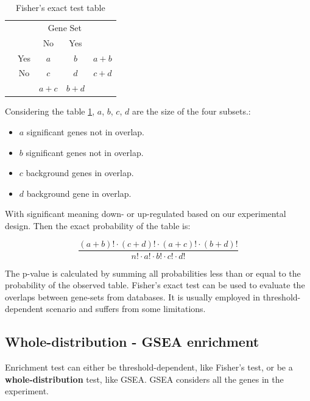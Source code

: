 		\begin{table}[H]
			\centering
			\begin{tabular}{ccccc}
				\multirow{4}{*}{\rotatebox[origin=c]{90}{\tiny{Up regulated genes}}}& \multicolumn{4}{c}{Gene Set}\\
				 & & No & Yes & \\
				 \cline{3-4}
				 &Yes & \multicolumn{1}{|c|}{$a$} & \multicolumn{1}{|c|}{$b$} & $a+b$\\
				 \cline{3-4}
				 &No & \multicolumn{1}{|c|}{$c$} & \multicolumn{1}{|c|}{$d$} & $c+d$\\
				 \cline{3-4}
				 & & $a+c$ & $b+d$ & \\
			\end{tabular}
			\caption{Fisher's exact test table}
			\label{tab:fisher}
		\end{table}

		Considering the table \ref{tab:fisher}, $a$, $b$, $c$, $d$ are the size of the four subsets.:

		\begin{multicols}{2}
			\begin{itemize}
				\item $a$ significant genes not in overlap.
				\item $b$ significant genes not in overlap.
				\item $c$ background genes in overlap.
				\item $d$ background gene in overlap.
			\end{itemize}
		\end{multicols}

		With significant meaning down- or up-regulated based on our experimental design.
		Then the exact probability of the table is:

		$$\frac{(a+b)!\cdot(c+d)!\cdot(a+c)!\cdot(b+d)!}{n!\cdot a!\cdot b!\cdot c!\cdot d!}$$

		The p-value is calculated by summing all probabilities less than or equal to the probability of the observed table.
		Fisher's exact test can be used to evaluate the overlaps between gene-sets from databases.
		It is usually employed in threshold-dependent scenario and suffers from some limitations.

	\subsection{Whole-distribution - GSEA enrichment}
	Enrichment test can either be threshold-dependent, like Fisher's test, or be a \textbf{whole-distribution} test, like GSEA.
	GSEA considers all the genes in the experiment.

